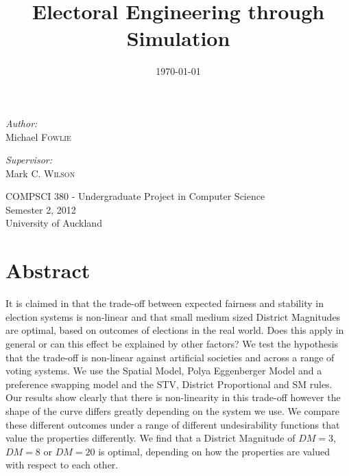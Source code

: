 \documentclass{article}
\title{Electoral Engineering through Simulation}
\date{\today}
\begin{document}
\maketitle

\begin{minipage}{0.4\textwidth}
\begin{flushleft} \large
\emph{Author:}\\
Michael \textsc{Fowlie}
\end{flushleft}
\end{minipage}
\begin{minipage}{0.4\textwidth}
\begin{flushright} \large
\emph{Supervisor:} \\
Mark C. \textsc{Wilson}
\end{flushright}
\end{minipage}

\hspace{20cm}

\begin{flushleft}
COMPSCI 380 - Undergraduate Project in Computer Science \\
Semester 2, 2012 \\
University of Auckland
\end{flushleft}

\newpage

\tableofcontents
\newpage

\section{Abstract}
It is claimed in \cite{sweetspot} that the trade-off between expected fairness and stability in election systems is non-linear and that small medium sized District Magnitudes are optimal, based on outcomes of elections in the real world. Does this apply in general or can this effect be explained by other factors? We test the hypothesis that the trade-off is non-linear against artificial societies and across a range of voting systems. We use the Spatial Model, Polya Eggenberger Model and a preference swapping model and the STV, District Proportional and SM rules. Our results show clearly that there is non-linearity in this trade-off however the shape of the curve differs greatly depending on the system we use. We compare these different outcomes under a range of different undesirability functions that value the properties differently. We find that a District Magnitude of $DM=3$, $DM=8$ or $DM=20$ is optimal, depending on how the properties are valued with respect to each other.
\end{document}

